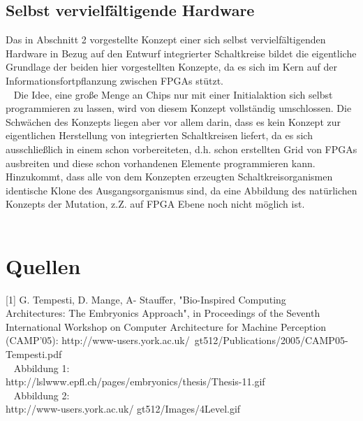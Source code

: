 \documentclass[12p, a4]{article}
\begin{document}
\subsection{Selbst vervielfältigende Hardware}
Das in Abschnitt 2 vorgestellte Konzept einer sich selbst vervielfältigenden
Hardware in Bezug auf den Entwurf integrierter Schaltkreise bildet
die eigentliche Grundlage der beiden hier vorgestellten Konzepte, da es
sich im Kern auf der Informationsfortpflanzung zwischen FPGAs stützt.\\
\ \newline
Die Idee, eine große Menge an Chips nur mit einer Initialaktion sich selbst
programmieren zu lassen, wird von diesem Konzept vollständig umschlossen.
Die Schwächen des Konzepts liegen aber vor allem darin, dass es kein
Konzept zur eigentlichen Herstellung von integrierten Schaltkreisen liefert,
da es sich ausschließlich in einem schon vorbereiteten, d.h. schon erstellten
Grid von FPGAs ausbreiten und diese schon vorhandenen Elemente programmieren
kann. Hinzukommt, dass alle von dem Konzepten erzeugten Schaltkreisorganismen
identische Klone des Ausgangsorganismus sind, da eine Abbildung des
natürlichen Konzepts der Mutation, z.Z. auf FPGA Ebene noch nicht möglich
ist.\\
\ \newpage

\section{Quellen}
[1] G. Tempesti, D. Mange, A- Stauffer, "Bio-Inspired Computing\\
Architectures:
The Embryonics Approach", in Proceedings of the Seventh International
Workshop on Computer Architecture for Machine Perception (CAMP’05)\newline
[Online]: http://www-users.york.ac.uk/~gt512/Publications/2005/CAMP05-Tempesti.pdf\\
\ \newline
Abbildung 1:\\
http://lslwww.epfl.ch/pages/embryonics/thesis/Thesis-11.gif\\
\ \newline
Abbildung 2:\\
http://www-users.york.ac.uk/ gt512/Images/4Level.gif\\
\ \newline
\end{document}
